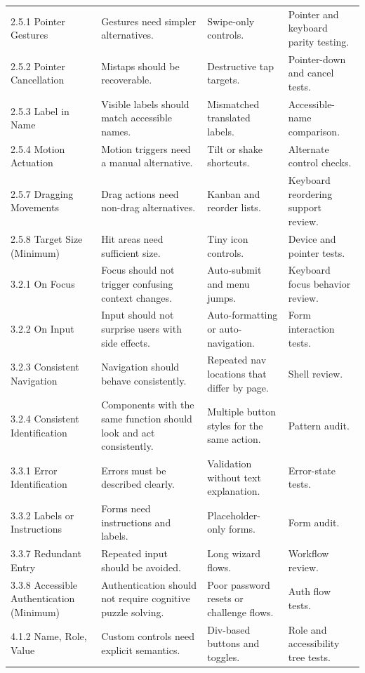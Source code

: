 \begin{longtable}{@{}p{}p{}p{}p{}@{}}
2.5.1 Pointer Gestures & Gestures need simpler alternatives. & Swipe-only controls. & Pointer and keyboard parity testing. \\
2.5.2 Pointer Cancellation & Mistaps should be recoverable. & Destructive tap targets. & Pointer-down and cancel tests. \\
2.5.3 Label in Name & Visible labels should match accessible names. & Mismatched translated labels. & Accessible-name comparison. \\
2.5.4 Motion Actuation & Motion triggers need a manual alternative. & Tilt or shake shortcuts. & Alternate control checks. \\
2.5.7 Dragging Movements & Drag actions need non-drag alternatives. & Kanban and reorder lists. & Keyboard reordering support review. \\
2.5.8 Target Size (Minimum) & Hit areas need sufficient size. & Tiny icon controls. & Device and pointer tests. \\
3.2.1 On Focus & Focus should not trigger confusing context changes. & Auto-submit and menu jumps. & Keyboard focus behavior review. \\
3.2.2 On Input & Input should not surprise users with side effects. & Auto-formatting or auto-navigation. & Form interaction tests. \\
3.2.3 Consistent Navigation & Navigation should behave consistently. & Repeated nav locations that differ by page. & Shell review. \\
3.2.4 Consistent Identification & Components with the same function should look and act consistently. & Multiple button styles for the same action. & Pattern audit. \\
3.3.1 Error Identification & Errors must be described clearly. & Validation without text explanation. & Error-state tests. \\
3.3.2 Labels or Instructions & Forms need instructions and labels. & Placeholder-only forms. & Form audit. \\
3.3.7 Redundant Entry & Repeated input should be avoided. & Long wizard flows. & Workflow review. \\
3.3.8 Accessible Authentication (Minimum) & Authentication should not require cognitive puzzle solving. & Poor password resets or challenge flows. & Auth flow tests. \\
4.1.2 Name, Role, Value & Custom controls need explicit semantics. & Div-based buttons and toggles. & Role and accessibility tree tests. \\
\end{longtable}

